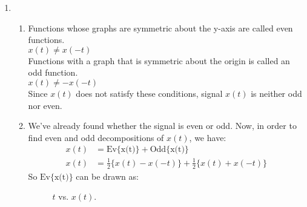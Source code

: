 \documentclass[10pt,a4paper, margin=1in]{article}
\begin{document}
\begin{enumerate}
\item %
    \begin{enumerate}
    \item 
    Functions whose graphs are symmetric about the y-axis are called even functions. \\
    \( x(t) \neq x(-t) \) \\
    Functions with a graph that is symmetric about the origin is called an odd function. \\
    \( x(t) \neq -x(-t) \) \\
    Since \( x(t) \) does not satisfy these conditions, signal \( x(t) \) is neither odd nor even.
    \item %
    We've already found whether the signal is even or odd. Now, in order to find even and odd decompositions of $x(t)$, we have:
        \begin{align*}
        x(t)&=\text{Ev\{x(t)\}} + \text{Odd\{x(t)\}} \\
        x(t)&=\frac{1}{2}\{x(t)-x(-t)\} + \frac{1}{2}\{x(t)+x(-t)\}
        \end{align*}
    So $\text{Ev\{x(t)\}}$ can be drawn as: \\
    \begin{figure}[h!]
    \centering
        \caption{$t$ vs. $x(t)$.}
        \label{fig:q2}
    \end{figure}
    

\end{enumerate}
\end{enumerate}
\end{document}

